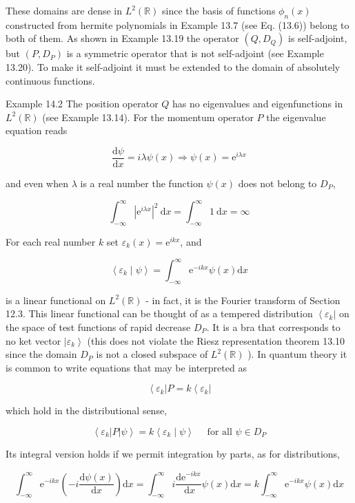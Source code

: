 \documentclass[10pt]{article}
\begin{document}
These domains are dense in $L^{2}(\mathbb{R})$ since the basis of functions $\phi_{n}(x)$ constructed from hermite polynomials in Example 13.7 (see Eq. (13.6)) belong to both of them. As shown in Example 13.19 the operator $\left(Q, D_{Q}\right)$ is self-adjoint, but $\left(P, D_{P}\right)$ is a symmetric operator that is not self-adjoint (see Example 13.20). To make it self-adjoint it must be extended to the domain of absolutely continuous functions.

Example 14.2 The position operator $Q$ has no eigenvalues and eigenfunctions in $L^{2}(\mathbb{R})$ (see Example 13.14). For the momentum operator $P$ the eigenvalue equation reads

$$
\frac{\mathrm{d} \psi}{\mathrm{d} x}=i \lambda \psi(x) \Longrightarrow \psi(x)=\mathrm{e}^{i \lambda x}
$$

and even when $\lambda$ is a real number the function $\psi(x)$ does not belong to $D_{P}$,

$$
\int_{-\infty}^{\infty}\left|\mathrm{e}^{i \lambda x}\right|^{2} \mathrm{~d} x=\int_{-\infty}^{\infty} 1 \mathrm{~d} x=\infty
$$

For each real number $k$ set $\varepsilon_{k}(x)=\mathrm{e}^{i k x}$, and

$$
\left\langle\varepsilon_{k} \mid \psi\right\rangle=\int_{-\infty}^{\infty} \mathrm{e}^{-i k x} \psi(x) \mathrm{d} x
$$

is a linear functional on $L^{2}(\mathbb{R})$ - in fact, it is the Fourier transform of Section 12.3. This linear functional can be thought of as a tempered distribution $\left\langle\varepsilon_{k}\right|$ on the space of test functions of rapid decrease $D_{P}$. It is a bra that corresponds to no ket vector $\left|\varepsilon_{k}\right\rangle$ (this does not violate the Riesz representation theorem 13.10 since the domain $D_{P}$ is not a closed subspace of $L^{2}(\mathbb{R})$ ). In quantum theory it is common to write equations that may be interpreted as

$$
\left\langle\varepsilon_{k}\right| P=k\left\langle\varepsilon_{k}\right|
$$

which hold in the distributional sense,

$$
\left\langle\varepsilon_{k}|P| \psi\right\rangle=k\left\langle\varepsilon_{k} \mid \psi\right\rangle \quad \text { for all } \psi \in D_{P}
$$

Its integral version holds if we permit integration by parts, as for distributions,

$$
\int_{-\infty}^{\infty} \mathrm{e}^{-i k x}\left(-i \frac{\mathrm{d} \psi(x)}{\mathrm{d} x}\right) \mathrm{d} x=\int_{-\infty}^{\infty} i \frac{\mathrm{de}^{-i k x}}{\mathrm{~d} x} \psi(x) \mathrm{d} x=k \int_{-\infty}^{\infty} \mathrm{e}^{-i k x} \psi(x) \mathrm{d} x
$$
\end{document}
